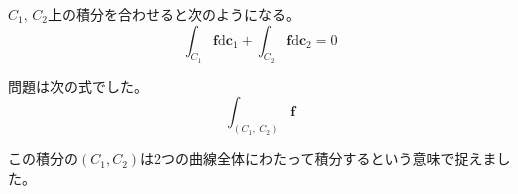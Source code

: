 \documentclass[12pt,b5paper]{ltjsarticle}
\begin{document}
\begin{enumerate}
      $C_1,\, C_2$上の積分を合わせると次のようになる。
      \begin{equation}
       \int_{C_1}\bm{f}\mathrm{d}\bm{c}_1
        + \int_{C_2}\bm{f}\mathrm{d}\bm{c}_2
        =0
      \end{equation}



      \dotfill

      問題は次の式でした。
      \begin{equation}
       \int_{(C_1,\ C_2)} \bm{f} %
      \end{equation}

      この積分の$(C_1,C_2)$は2つの曲線全体にわたって積分するという意味で捉えました。
      


\end{enumerate}
\end{document}
